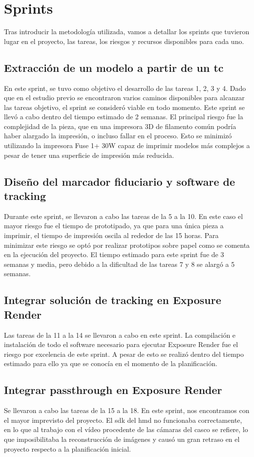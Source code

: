 \section{Sprints}
Tras introducir la metodología utilizada, vamos a detallar los sprints que tuvieron lugar en el proyecto, las tareas, los riesgos y recursos disponibles para cada uno.
\subsection{Extracción de un modelo a partir de un \acrshort{tc}}
En este sprint, se tuvo como objetivo el desarrollo de las tareas 1, 2, 3 y 4. Dado que en el estudio previo se encontraron varios caminos disponibles para alcanzar las tareas objetivo, el sprint se consideró viable en todo momento. Este sprint se llevó a cabo dentro del tiempo estimado de 2 semanas. El principal riesgo fue la complejidad de la pieza, que en una impresora 3D de filamento común podría haber alargado la impresión, o incluso fallar en el proceso. Esto se minimizó utilizando la impresora Fuse 1+ 30W capaz de imprimir modelos más complejos a pesar de tener una superficie de impresión más reducida.

\subsection{Diseño del marcador fiduciario y software de tracking}
Durante este sprint, se llevaron a cabo las tareas de la 5 a la 10. En este caso el mayor riesgo fue el tiempo de prototipado, ya que para una única pieza a imprimir, el tiempo de impresión oscila al rededor de las 15 horas. Para minimizar este riesgo se optó por realizar prototipos sobre papel como se comenta en la ejecución del proyecto. El tiempo estimado para este sprint fue de 3 semanas y media, pero debido a la dificultad de las tareas 7 y 8 se alargó a 5 semanas.

\subsection{Integrar solución de tracking en Exposure Render}
Las tareas de la 11 a la 14 se llevaron a cabo en este sprint. La compilación e instalación de todo el software necesario para ejecutar Exposure Render fue el riesgo por excelencia de este sprint. A pesar de esto se realizó dentro del tiempo estimado para ello ya que se conocía en el momento de la planificación.

\subsection{Integrar passthrough en Exposure Render}
Se llevaron a cabo las tareas de la 15 a la 18. En este sprint, nos encontramos con el mayor imprevisto del proyecto. El \acrshort{sdk} del \acrshort{hmd} no funcionaba correctamente, en lo que al trabajo con el vídeo procedente de las cámaras del casco se refiere, lo que imposibilitaba la reconstrucción de imágenes y causó un gran retraso en el proyecto respecto a la planificación inicial.

